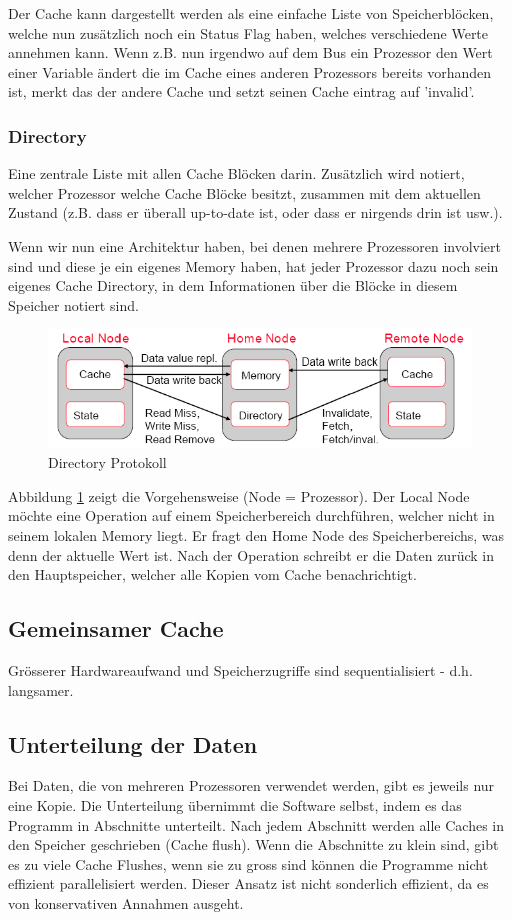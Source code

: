 Der Cache kann dargestellt werden als eine einfache Liste von Speicherblöcken, welche nun zusätzlich noch ein Status Flag haben, welches verschiedene Werte annehmen kann. Wenn z.B. nun irgendwo auf dem Bus ein Prozessor den Wert einer Variable ändert die im Cache eines anderen Prozessors bereits vorhanden ist, merkt das der andere Cache und setzt seinen Cache eintrag auf 'invalid'.

\subsubsection{Directory}
Eine zentrale Liste mit allen Cache Blöcken darin. Zusätzlich wird notiert, welcher Prozessor welche Cache Blöcke besitzt, zusammen mit dem aktuellen Zustand (z.B. dass er überall up-to-date ist, oder dass er nirgends drin ist usw.).

Wenn wir nun eine Architektur haben, bei denen mehrere Prozessoren involviert sind und diese je ein eigenes Memory haben, hat jeder Prozessor dazu noch sein eigenes Cache Directory, in dem Informationen über die Blöcke in diesem Speicher notiert sind.

\begin{figure}
\centering
\includegraphics[width=0.7\linewidth]{fig/directory_protocol}
\caption{Directory Protokoll}
\label{fig:directory_protocol}
\end{figure}

Abbildung \ref{fig:directory_protocol} zeigt die Vorgehensweise (Node = Prozessor). Der Local Node möchte eine Operation auf einem Speicherbereich durchführen, welcher nicht in seinem lokalen Memory liegt. Er fragt den Home Node des Speicherbereichs, was denn der aktuelle Wert ist. Nach der Operation schreibt er die Daten zurück in den Hauptspeicher, welcher alle Kopien vom Cache benachrichtigt.

\subsection{Gemeinsamer Cache}
Grösserer Hardwareaufwand und Speicherzugriffe sind sequentialisiert -  d.h. langsamer.

\subsection{Unterteilung der Daten}
Bei Daten, die von mehreren Prozessoren verwendet werden, gibt es jeweils nur eine Kopie. Die Unterteilung übernimmt die Software selbst, indem es das Programm in Abschnitte unterteilt. Nach jedem Abschnitt werden alle Caches in den Speicher geschrieben (Cache flush). Wenn die Abschnitte zu klein sind, gibt es zu viele Cache Flushes, wenn sie zu gross sind können die Programme nicht effizient parallelisiert werden. Dieser Ansatz ist nicht sonderlich effizient, da es von konservativen Annahmen ausgeht.
 
